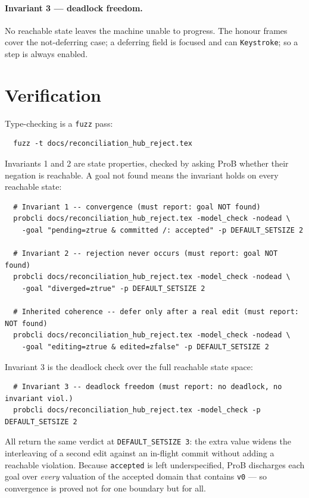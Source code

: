 \documentclass[a4paper,10pt,fleqn]{article}
\begin{document}
\paragraph{Invariant 3 --- deadlock freedom.}
No reachable state leaves the machine unable to progress.  The honour frames cover
the not-deferring case; a deferring field is focused and can \texttt{Keystroke};
so a step is always enabled.

\section{Verification}
\label{sec:verify}

Type-checking is a \texttt{fuzz} pass:
\begin{verbatim}
  fuzz -t docs/reconciliation_hub_reject.tex
\end{verbatim}

Invariants 1 and 2 are state properties, checked by asking ProB whether their
negation is reachable.  A goal not found means the invariant holds on every
reachable state:
\begin{verbatim}
  # Invariant 1 -- convergence (must report: goal NOT found)
  probcli docs/reconciliation_hub_reject.tex -model_check -nodead \
    -goal "pending=ztrue & committed /: accepted" -p DEFAULT_SETSIZE 2

  # Invariant 2 -- rejection never occurs (must report: goal NOT found)
  probcli docs/reconciliation_hub_reject.tex -model_check -nodead \
    -goal "diverged=ztrue" -p DEFAULT_SETSIZE 2

  # Inherited coherence -- defer only after a real edit (must report: NOT found)
  probcli docs/reconciliation_hub_reject.tex -model_check -nodead \
    -goal "editing=ztrue & edited=zfalse" -p DEFAULT_SETSIZE 2
\end{verbatim}

Invariant 3 is the deadlock check over the full reachable state space:
\begin{verbatim}
  # Invariant 3 -- deadlock freedom (must report: no deadlock, no invariant viol.)
  probcli docs/reconciliation_hub_reject.tex -model_check -p DEFAULT_SETSIZE 2
\end{verbatim}

All return the same verdict at \texttt{DEFAULT\_SETSIZE 3}: the extra value widens
the interleaving of a second edit against an in-flight commit without adding a
reachable violation.  Because \texttt{accepted} is left underspecified, ProB
discharges each goal over \emph{every} valuation of the accepted domain that
contains \texttt{v0} --- so convergence is proved not for one boundary but for all.
\end{document}
